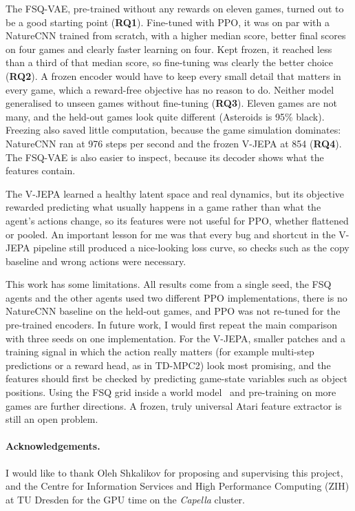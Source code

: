\documentclass[runningheads]{llncs}
\begin{document}
The FSQ-VAE, pre-trained without any rewards on eleven games, turned out to be a good starting
point (\textbf{RQ1}). Fine-tuned with PPO, it was on par with a NatureCNN trained from scratch,
with a higher median score, better final scores on four games and clearly faster learning on
four. Kept frozen, it reached less than a third of that median score, so fine-tuning was
clearly the better choice (\textbf{RQ2}). A frozen encoder would have to keep every small detail that
matters in every game, which a reward-free objective has no reason to do. Neither
model generalised to unseen games without fine-tuning (\textbf{RQ3}). Eleven games are not many,
and the held-out games look quite different (Asteroids is 95\% black). Freezing also saved
little computation, because the game simulation dominates: NatureCNN ran at 976 steps per
second and the frozen V-JEPA at 854 (\textbf{RQ4}). The FSQ-VAE is also easier to inspect,
because its decoder shows what the features contain.

The V-JEPA learned a healthy latent space and real dynamics, but its objective rewarded
predicting what usually happens in a game rather than what the agent's actions change, so its
features were not useful for PPO, whether flattened or pooled. An important lesson for me was that
every bug and shortcut in the V-JEPA pipeline still produced a nice-looking loss curve, so
checks such as the copy baseline and wrong actions were necessary.

This work has some limitations. All results come from a single seed, the FSQ agents and the
other agents used two different PPO implementations, there is no NatureCNN baseline on the
held-out games, and PPO was not re-tuned for the pre-trained encoders. In future work, I would
first repeat the main comparison with three seeds on one implementation. For the V-JEPA,
smaller patches and a training signal in which the action really matters (for example
multi-step predictions or a reward head, as in TD-MPC2) look most promising, and the features
should first be checked by predicting game-state variables such as object
positions. Using the FSQ grid inside a world
model~\cite{hafner2021dreamerv2,micheli2023iris} and pre-training on more games are further
directions. A frozen, truly universal Atari feature extractor is still an open problem.

\paragraph{Acknowledgements.}
I would like to thank Oleh Shkalikov for proposing and supervising this project, and the
Centre for Information Services and High Performance Computing (ZIH) at TU Dresden for the GPU
time on the \emph{Capella} cluster.



\end{document}
